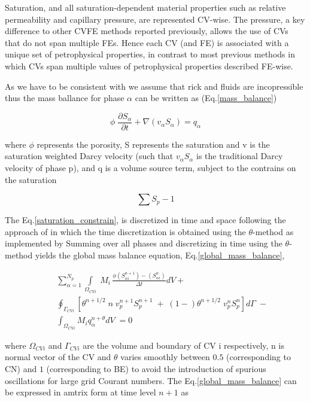 \documentclass[preprint,authoryear,12pt]{elsarticle}
\begin{document}
Saturation, and all saturation-dependent material properties such as relative permeability and capillary pressure, are represented CV-wise. The pressure, a key difference to other CVFE methods reported previously, allows the use of CVs that do not span multiple FEs. Hence each CV (and FE) is associated with a unique set of petrophysical properties, in contrast to most previous methods in which CVs span multiple values of petrophysical properties described FE-wise.

As we have to be consistent with \citet{jackson_2015} we assume that rick and fluids are incopressible thus the mass ballance for phase $\alpha$ can be written as (Eq.\ref{mass_balance})

\begin{equation}
\phi \; \frac{\partial S_{\alpha}}{\partial t} + \nabla (v_{\alpha}S_{\alpha})= q_{\alpha}
\label{mass_balance}
\end{equation}
 
where $\phi$ represents the porosity, S represents the saturation and v is the saturation weighted Darcy velocity (such that $v_{\alpha}S_{\alpha}$ is the traditional Darcy velocity of phase p), and q is a volume source term, subject to the contrains on the saturation

\begin{equation}
\sum  S_{p}-1
\label{saturation_constrain}
\end{equation}

The Eq.\ref{saturation_constrain}, is discretized in time and space following the approach of \citet{Jackson_2013} in which the time discretization is obtained using the $\theta$-method as implemented by %
Summing over all phases and discretizing in time using the $\theta$-method yields the global mass balance equation, Eq.\ref{global_mass_balance},

\begin{eqnarray}
 && \sum_{\alpha=1}^{N_{p}} \int\limits_{\Omega_{CVi}} \; M_{i} \, \frac{\phi\left(S_{\alpha i}^{n+1}\right)-\left(S_{\alpha i}^{n}\right)}{\Delta t} dV  + \nonumber\\
 &&  \oint_{\Gamma_{CVi}} [\theta^{n+1/2}\; n\dot\;v_{p}^{n+1}S_{p}^{n+1}\;+\;(1-)\theta^{n+1/2}\;v_{p}^{n}S_{p}^{n}] d\Gamma \;- \nonumber\\
 &&  \int_{\Omega_{CVi}} M_{i}q_{\alpha}^{n+\theta}dV\; =0
\label{global_mass_balance}
\end{eqnarray}

where $\Omega_{CVi}$ and $\Gamma_{CVi}$ are the volume and boundary of CV i respectively, n is normal vector of the CV and $\theta$ varies smoothly between $0.5$ (corresponding to CN) and $1$ (corresponding to BE) to avoid the introduction of spurious oscillations for large grid Courant numbers. The Eq.\ref{global_mass_balance} can be expressed in amtrix form at time level $n+1$ as
\end{document}
